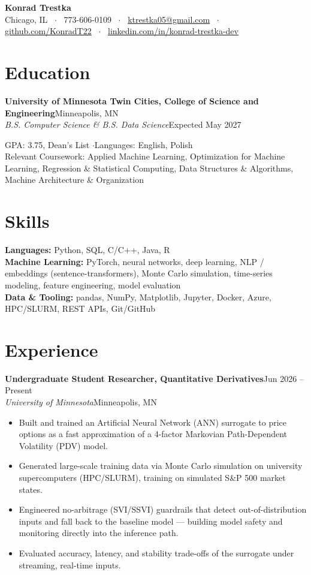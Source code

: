 \documentclass[letterpaper,10.5pt]{article}
\newcommand{\entry}[4]{\textbf{#1}\hfill{\small #2}\\\textit{\small #3}\hfill{\small #4}\par\vspace{1pt}}
\begin{document}
{\centering
{\LARGE\bfseries Konrad Trestka}\\[3pt]
{\small Chicago, IL ~$\cdot$~ 773-606-0109 ~$\cdot$~ \href{mailto:ktrestka05@gmail.com}{ktrestka05@gmail.com} ~$\cdot$~ \href{https://github.com/KonradT22}{github.com/KonradT22} ~$\cdot$~ \href{https://www.linkedin.com/in/konrad-trestka-dev}{linkedin.com/in/konrad-trestka-dev}}\par}
\vspace{2pt}

\section{Education}
\entry{University of Minnesota Twin Cities, College of Science and Engineering}{Minneapolis, MN}{B.S. Computer Science \& B.S. Data Science}{Expected May 2027}
{\small GPA: 3.75, Dean's List \quad$\cdot$\quad Languages: English, Polish \\
Relevant Coursework: Applied Machine Learning, Optimization for Machine Learning, Regression \& Statistical Computing, Data Structures \& Algorithms, Machine Architecture \& Organization}

\section{Skills}
{\small \textbf{Languages:} Python, SQL, C/C++, Java, R \\
\textbf{Machine Learning:} PyTorch, neural networks, deep learning, NLP / embeddings (sentence-transformers), Monte Carlo simulation, time-series modeling, feature engineering, model evaluation \\
\textbf{Data \& Tooling:} pandas, NumPy, Matplotlib, Jupyter, Docker, Azure, HPC/SLURM, REST APIs, Git/GitHub}

\section{Experience}
\entry{Undergraduate Student Researcher, Quantitative Derivatives}{Jun 2026 -- Present}{University of Minnesota}{Minneapolis, MN}
\begin{itemize}
  \item Built and trained an Artificial Neural Network (ANN) surrogate to price options as a fast approximation of a 4-factor Markovian Path-Dependent Volatility (PDV) model.
  \item Generated large-scale training data via Monte Carlo simulation on university supercomputers (HPC/SLURM), training on simulated S\&P 500 market states.
  \item Engineered no-arbitrage (SVI/SSVI) guardrails that detect out-of-distribution inputs and fall back to the baseline model --- building model safety and monitoring directly into the inference path.
  \item Evaluated accuracy, latency, and stability trade-offs of the surrogate under streaming, real-time inputs.
\end{itemize}
\end{document}
